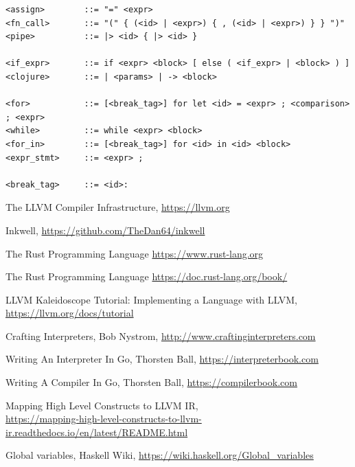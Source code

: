 ﻿\documentclass{article}
\begin{document}
\begin{verbatim}
<assign>        ::= "=" <expr>
<fn_call>       ::= "(" { (<id> | <expr>) { , (<id> | <expr>) } } ")"
<pipe>          ::= |> <id> { |> <id> }

<if_expr>       ::= if <expr> <block> [ else ( <if_expr> | <block> ) ]
<clojure>       ::= | <params> | -> <block>

<for>           ::= [<break_tag>] for let <id> = <expr> ; <comparison> ; <expr>
<while>         ::= while <expr> <block>
<for_in>        ::= [<break_tag>] for <id> in <id> <block>
<expr_stmt>     ::= <expr> ;

<break_tag>     ::= <id>:
\end{verbatim}

\begin{thebibliography}{9}
The LLVM Compiler Infrastructure, \url{https://llvm.org}

 Inkwell, \url{https://github.com/TheDan64/inkwell}

 The Rust Programming Language \url{https://www.rust-lang.org}

 The Rust Programming Language \url{https://doc.rust-lang.org/book/}

 LLVM Kaleidoscope Tutorial: Implementing a Language with LLVM,\\ \url{https://llvm.org/docs/tutorial}

Crafting Interpreters, Bob Nystrom, \url{http://www.craftinginterpreters.com}

Writing An Interpreter In Go, Thorsten Ball, \url{https://interpreterbook.com}

Writing A Compiler In Go, Thorsten Ball, \url{https://compilerbook.com}

 Mapping High Level Constructs to LLVM IR, \\
\url{https://mapping-high-level-constructs-to-llvm-ir.readthedocs.io/en/latest/README.html}

 Global variables, Haskell Wiki, \url{https://wiki.haskell.org/Global_variables}

\end{thebibliography}
\end{document}
